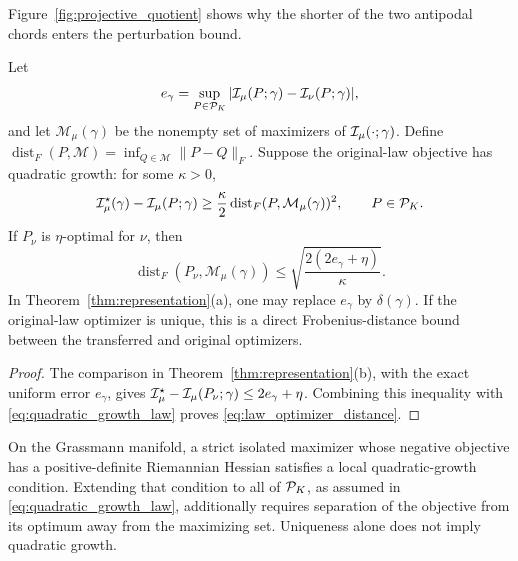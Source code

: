 Figure~\ref{fig:projective_quotient} shows why the shorter of the two
antipodal chords enters the perturbation bound.
\ProjectiveSphereFigure

\begin{corollary}
\label{cor:law_optimizer}
Let
\begin{equation}
e_\gamma=\sup_{P\in\mathcal P_K}
|\mathcal I_\mu(P;\gamma)-\mathcal I_\nu(P;\gamma)|,
\end{equation}
and let $\mathcal M_\mu(\gamma)$ be the nonempty set of maximizers of
$\mathcal I_\mu(\cdot;\gamma)$. Define
$\operatorname{dist}_F(P,\mathcal M)=\inf_{Q\in\mathcal M}\|P-Q\|_F$.
Suppose the original-law objective has quadratic growth:
for some $\kappa>0$,
\begin{equation}
\mathcal I_\mu^\star(\gamma)-\mathcal I_\mu(P;\gamma)
\ge \frac{\kappa}{2}\operatorname{dist}_F
   (P,\mathcal M_\mu(\gamma))^2,
\qquad P\in\mathcal P_K.
\label{eq:quadratic_growth_law}
\end{equation}
If $P_\nu$ is $\eta$-optimal for $\nu$, then
\begin{equation}
\operatorname{dist}_F(P_\nu,\mathcal M_\mu(\gamma))
\le \sqrt{\frac{2(2e_\gamma+\eta)}{\kappa}}.
\label{eq:law_optimizer_distance}
\end{equation}
In Theorem~\ref{thm:representation}(a), one may replace $e_\gamma$ by
$\delta(\gamma)$. If the original-law optimizer is unique, this is a direct
Frobenius-distance bound between the transferred and original optimizers.
\end{corollary}
\begin{proof}
The comparison in Theorem~\ref{thm:representation}(b), with the exact uniform
error $e_\gamma$, gives
$\mathcal I_\mu^\star-\mathcal I_\mu(P_\nu;\gamma)\le2e_\gamma+\eta$.
Combining this inequality with \eqref{eq:quadratic_growth_law} proves
\eqref{eq:law_optimizer_distance}.
\end{proof}

\begin{remark}
On the Grassmann manifold, a strict isolated maximizer whose negative objective
has a positive-definite Riemannian Hessian satisfies a local quadratic-growth
condition. Extending that condition to all of $\mathcal P_K$, as assumed in
\eqref{eq:quadratic_growth_law}, additionally requires separation of the
objective from its optimum away from the maximizing set. Uniqueness alone does
not imply quadratic growth.
\end{remark}


